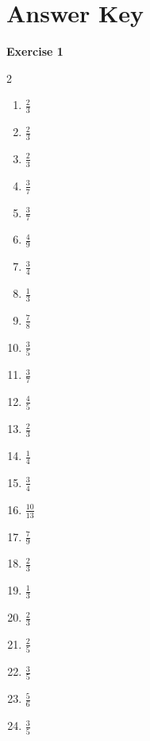 \documentclass[12pt]{article}
\begin{document}
\section*{Answer Key}
\textbf{Exercise 1}
\begin{multicols}{2}
\begin{enumerate}
\item $\tfrac{2}{3}$
\item $\tfrac{2}{3}$
\item $\tfrac{2}{3}$
\item $\tfrac{3}{7}$
\item $\tfrac{3}{7}$
\item $\tfrac{4}{9}$
\item $\tfrac{3}{4}$
\item $\tfrac{1}{3}$
\item $\tfrac{7}{8}$
\item $\tfrac{3}{5}$
\item $\tfrac{3}{7}$
\item $\tfrac{4}{5}$
\item $\tfrac{2}{3}$
\item $\tfrac{1}{4}$
\item $\tfrac{3}{4}$
\item $\tfrac{10}{13}$
\item $\tfrac{7}{9}$
\item $\tfrac{2}{3}$
\item $\tfrac{1}{3}$
\item $\tfrac{2}{3}$
\item $\tfrac{2}{5}$
\item $\tfrac{3}{5}$
\item $\tfrac{5}{6}$
\item $\tfrac{3}{5}$
\end{enumerate}
\end{multicols}
\end{document}
